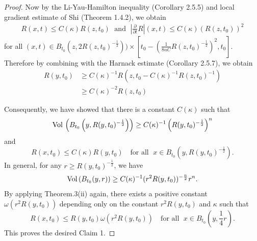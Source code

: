 \begin{proof}
Now by the Li-Yau-Hamilton inequality (Corollary 2.5.5) and local
gradient estimate of Shi (Theorem 1.4.2), we obtain
\begin{align*}
R(x,t)\leq C(\kappa)R(z,t_{0})\; \text{ and }\;
\left|\frac{\partial}{\partial t}R\right|(x,t) \leq
C(\kappa)(R(z,t_{0}))^{2}
\end{align*}
for all $ (x,t)\in
B_{t_{0}}(z,2R(z,t_{0})^{-\frac{1}{2}}))\times[t_{0}-
(\frac{1}{8nC}R(z,t_{0})^{-\frac{1}{2}})^{2},t_{0}]$. Therefore by
combining with the Harnack estimate (Corollary 2.5.7), we obtain
\begin{align*}
R(y,t_{0})&  \geq C(\kappa)^{-1}R(z,t_{0}-C(\kappa)^{-1}R(z,t_{0})^{-1})\\
&  \geq C(\kappa)^{-2} R(z,t_{0})
\end{align*}

Consequently, we have showed that there is a constant $C(\kappa)$
such that
$$
{\rm Vol}\, \left(B_{t_{0}}\left(y,R(y,t_{0})^{-\frac{1}{2}}\right)\right) \geq
C(\kappa)^{-1}\left(R(y,t_{0})^{-\frac{1}{2}}\right)^{n}
$$
and
$$
R(x,t_{0})\leq C(\kappa)R(y,t_{0}) \quad \text{for all }\; x\in
B_{t_{0}}\left(y,R(y,t_{0})^{-\frac{1}{2}}\right).
$$
In general, for any $r\geq R(y,t_{0})^{-\frac{1}{2}}$, we have
$$
{\rm Vol}\, (B_{t_{0}}(y,r)) \geq
C(\kappa)^{-1}(r^{2}R(y,t_{0}))^{-\frac{n}{2}}r^{n}.
$$
By\; applying\; Theorem.3(ii)\; again,\; there\; exists\;
a\; positive\; constant $\omega(r^{2}R(y,t_{0}))$ depending only
on the constant $r^{2}R(y,t_{0})$ and $\kappa$ such that
$$
R(x,t_{0})\leq R(y,t_{0})\omega(r^{2}R(y,t_{0}))\quad \mbox{for
all }\;  x\in B_{t_{0}}\left(y,\frac{1}{4}r\right).
$$
This proves the desired Claim 1.
\end{proof}

